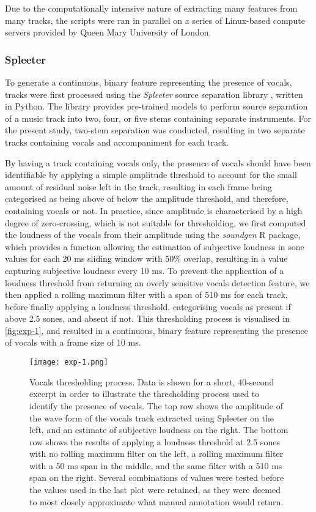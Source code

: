 Due to the computationally intensive nature of extracting many features from many tracks, the scripts were ran in parallel on a series of Linux-based compute servers provided by Queen Mary University of London.

\subsubsection{Spleeter}

To generate a continuous, binary feature representing the presence of vocals, tracks were first processed using the \emph{Spleeter} source separation library \parencite{hennequin2020}, written in Python. The library provides pre-trained models to perform source separation of a music track into two, four, or five stems containing separate instruments. For the present study, two-stem separation was conducted, resulting in two separate tracks containing vocals and accompaniment for each track.

By having a track containing vocals only, the presence of vocals should have been identifiable by applying a simple amplitude threshold to account for the small amount of residual noise left in the track, resulting in each frame being categorised as being above of below the amplitude threshold, and therefore, containing vocals or not. In practice, since amplitude is characterised by a high degree of zero-crossing, which is not suitable for thresholding, we first computed the loudness of the vocals from their amplitude using the \emph{soundgen} R package, which provides a function allowing the estimation of subjective loudness in sone values for each 20 ms sliding window with 50\% overlap, resulting in a value capturing subjective loudness every 10 ms. To prevent the application of a loudness threshold from returning an overly sensitive vocals detection feature, we then applied a rolling maximum filter with a span of 510 ms for each track, before finally applying a loudness threshold, categorising vocals as present if above 2.5 sones, and absent if not. This thresholding process is visualised in \autoref{fig:exp-1}, and resulted in a continuous, binary feature representing the presence of vocals with a frame size of 10 ms.

\begin{figure}[t!]
\texttt{[image: exp-1.png]}
\centering
\caption{Vocals thresholding process. Data is shown for a short, 40-second excerpt in order to illustrate the thresholding process used to identify the presence of vocals. The top row shows the amplitude of the wave form of the vocals track extracted using Spleeter on the left, and an estimate of subjective loudness on the right. The bottom row shows the results of applying a loudness threshold at 2.5 sones with no rolling maximum filter on the left, a rolling maximum filter with a 50 ms span in the middle, and the same filter with a 510 ms span on the right. Several combinations of values were tested before the values used in the last plot were retained, as they were deemed to most closely approximate what manual annotation would return.}
\label{fig:exp-1}
\end{figure}

